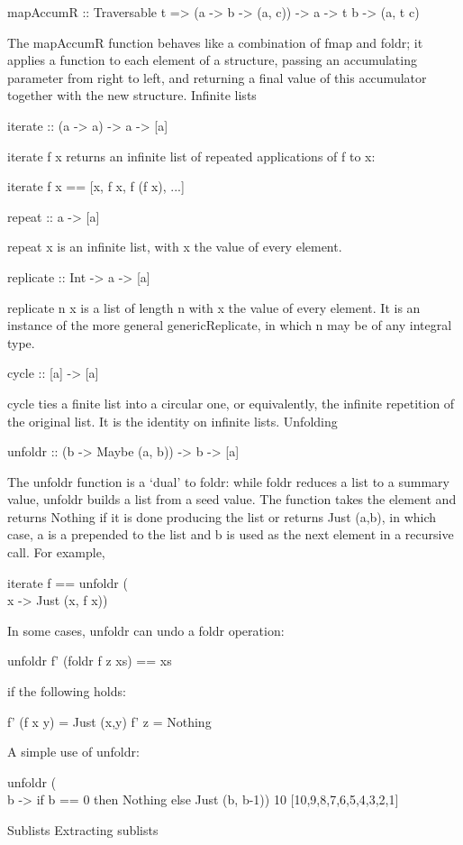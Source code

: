 mapAccumR :: Traversable t => (a -> b -> (a, c)) -> a -> t b -> (a, t c)

The mapAccumR function behaves like a combination of fmap and foldr; it applies a function to each element of a structure, passing an accumulating parameter from right to left, and returning a final value of this accumulator together with the new structure.
Infinite lists

iterate :: (a -> a) -> a -> [a]

iterate f x returns an infinite list of repeated applications of f to x:

iterate f x == [x, f x, f (f x), ...]

repeat :: a -> [a]

repeat x is an infinite list, with x the value of every element.

replicate :: Int -> a -> [a]

replicate n x is a list of length n with x the value of every element. It is an instance of the more general genericReplicate, in which n may be of any integral type.

cycle :: [a] -> [a]

cycle ties a finite list into a circular one, or equivalently, the infinite repetition of the original list. It is the identity on infinite lists.
Unfolding

unfoldr :: (b -> Maybe (a, b)) -> b -> [a]

The unfoldr function is a `dual' to foldr: while foldr reduces a list to a summary value, unfoldr builds a list from a seed value. The function takes the element and returns Nothing if it is done producing the list or returns Just (a,b), in which case, a is a prepended to the list and b is used as the next element in a recursive call. For example,

iterate f == unfoldr (\\x -> Just (x, f x))

In some cases, unfoldr can undo a foldr operation:

unfoldr f' (foldr f z xs) == xs

if the following holds:

f' (f x y) = Just (x,y)
f' z       = Nothing

A simple use of unfoldr:

unfoldr (\\b -> if b == 0 then Nothing else Just (b, b-1)) 10
 [10,9,8,7,6,5,4,3,2,1]

Sublists
Extracting sublists

